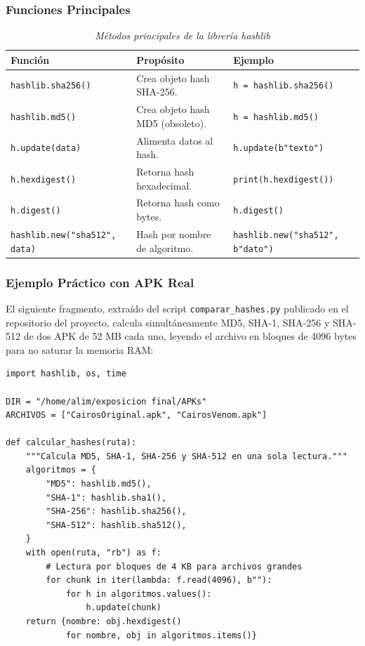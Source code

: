 \documentclass[12pt,a4paper]{article}
\begin{document}
\subsubsection{Funciones Principales}

\begin{table}[H]
\centering\footnotesize
\begin{threeparttable}
\caption{\textit{Métodos principales de la librería hashlib}}
\begin{tabular}{p{5cm}p{3.8cm}p{3.7cm}}
\toprule
\textbf{Función} & \textbf{Propósito} & \textbf{Ejemplo} \\
\midrule
\texttt{hashlib.sha256()} & Crea objeto hash SHA-256. & \texttt{h = hashlib.sha256()} \\
\texttt{hashlib.md5()} & Crea objeto hash MD5 (obsoleto). & \texttt{h = hashlib.md5()} \\
\texttt{h.update(data)} & Alimenta datos al hash. & \texttt{h.update(b"texto")} \\
\texttt{h.hexdigest()} & Retorna hash hexadecimal. & \texttt{print(h.hexdigest())} \\
\texttt{h.digest()} & Retorna hash como bytes. & \texttt{h.digest()} \\
\texttt{hashlib.new("sha512", data)} & Hash por nombre de algoritmo. & \texttt{hashlib.new("sha512", b"dato")} \\
\bottomrule
\end{tabular}
\end{threeparttable}
\end{table}

\subsubsection{Ejemplo Práctico con APK Real}

El siguiente fragmento, extraído del script \texttt{comparar\_hashes.py}
publicado en el repositorio del proyecto, calcula simultáneamente
MD5, SHA-1, SHA-256 y SHA-512 de dos APK de 52 MB cada uno, leyendo
el archivo en bloques de 4096 bytes para no saturar la memoria RAM:

\begin{lstlisting}[caption={Cálculo simultáneo de cuatro hashes sobre APK de 52 MB},
                   label=lst:hashlib_apk]
import hashlib, os, time

DIR = "/home/alim/exposicion final/APKs"
ARCHIVOS = ["CairosOriginal.apk", "CairosVenom.apk"]

def calcular_hashes(ruta):
    """Calcula MD5, SHA-1, SHA-256 y SHA-512 en una sola lectura."""
    algoritmos = {
        "MD5": hashlib.md5(),
        "SHA-1": hashlib.sha1(),
        "SHA-256": hashlib.sha256(),
        "SHA-512": hashlib.sha512(),
    }
    with open(ruta, "rb") as f:
        # Lectura por bloques de 4 KB para archivos grandes
        for chunk in iter(lambda: f.read(4096), b""):
            for h in algoritmos.values():
                h.update(chunk)
    return {nombre: obj.hexdigest()
            for nombre, obj in algoritmos.items()}
\end{lstlisting}
\end{document}
